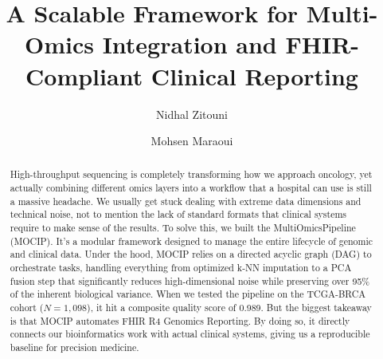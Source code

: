 \documentclass[runningheads]{llncs}
\begin{document}
\pagestyle{headings}
\sloppy

\title{A Scalable Framework for Multi-Omics Integration and FHIR-Compliant Clinical Reporting}

\author{Nidhal Zitouni \and Mohsen Maraoui}


\maketitle

\begin{abstract}
High-throughput sequencing is completely transforming how we approach oncology, yet actually combining different omics layers into a workflow that a hospital can use is still a massive headache. We usually get stuck dealing with extreme data dimensions and technical noise, not to mention the lack of standard formats that clinical systems require to make sense of the results. To solve this, we built the MultiOmicsPipeline (MOCIP). It's a modular framework designed to manage the entire lifecycle of genomic and clinical data. Under the hood, MOCIP relies on a directed acyclic graph (DAG) to orchestrate tasks, handling everything from optimized k-NN imputation to a PCA fusion step that significantly reduces high-dimensional noise while preserving over 95\% of the inherent biological variance. When we tested the pipeline on the TCGA-BRCA cohort ($N=1,098$), it hit a composite quality score of 0.989. But the biggest takeaway is that MOCIP automates FHIR R4 Genomics Reporting. By doing so, it directly connects our bioinformatics work with actual clinical systems, giving us a reproducible baseline for precision medicine.

\end{abstract}

\end{document}
